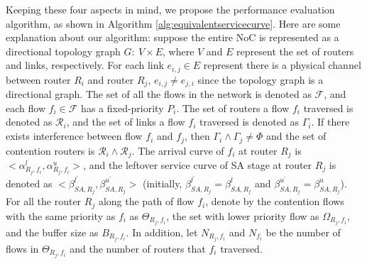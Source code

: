 \documentclass[10pt,journal]{IEEEtran}
\begin{document}
Keeping these four aspects in mind, we propose the performance evaluation algorithm, as shown in Algorithm \ref{alg:equivalentservicecurve}. Here are some explanation about our algorithm: suppose the entire NoC is represented as a directional topology graph $G:\ V\times E$, where $V$ and $E$ represent the set of routers and links, respectively. For each link $e_{i,j}\in E$ represent there is a physical channel between router $R_i$ and router $R_j$, $e_{i,j}\neq e_{j,i}$ since the topology graph is a directional graph. The set of all the flows in the network is denoted as $\mathcal{F}$, and each flow $f_i\in\mathcal{F}$ has a fixed-priority $P_i$. The set of routers a flow $f_i$ traversed is denoted as $\mathcal{R}_i$, and the set of links a flow $f_i$ traversed is denoted as $\Gamma_i$. If there exists interference between flow $f_i$ and $f_j$, then $\Gamma_i\wedge\Gamma_j\neq\Phi$ and the set of contention routers is $\mathcal{R}_i\wedge\mathcal{R}_j$. The arrival curve of $f_i$ at router $R_j$ is $<\alpha_{R_j,f_i}^l,\alpha_{R_j,f_i}^u>$, and the leftover service curve of SA stage at router $R_j$ is denoted as $<\beta_{SA,R_j}^{l^\prime},\beta_{SA,R_j}^{u^\prime}>$ (initially, $\beta_{SA,R_j}^{l^\prime}=\beta_{SA,R_j}^{l}$ and $\beta_{SA,R_j}^{u^\prime}=\beta_{SA,R_j}^{u}$). For all the router $R_j$ along the path of flow $f_i$, denote by the contention flows with the same priority as $f_i$ as $\Theta_{R_j,f_i}$, the set with lower priority flow as $\Omega_{R_j,f_i}$, and the buffer size as $B_{R_j,f_i}$. In addition, let $N_{R_j,f_i}$ and $N_{f_i}$ be the number of flows in $\Theta_{R_j,f_i}$ and the number of routers that $f_i$ traversed.
\end{document}

